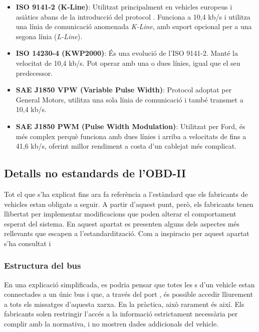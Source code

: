 \documentclass{tfgitic}[2024/07/01]
\begin{document}
\begin{itemize}
  \item \textbf{ISO 9141-2 (K-Line)}: Utilitzat principalment en vehicles europeus i asiàtics abans de la introducció del protocol . Funciona a 10,4 kb/s i utilitza 
  una línia de comunicació anomenada \textit{K-Line}, amb suport opcional per a una segona línia (\textit{L-Line}).
  
  \item \textbf{ISO 14230-4 (KWP2000)}: És una evolució de l'ISO 9141-2. Manté la velocitat de 10,4 kb/s. Pot operar amb una o dues línies, igual que el seu predecessor.
  
  \item \textbf{SAE J1850 VPW (Variable Pulse Width)}: Protocol adoptat per General Motors, utilitza una sola línia de comunicació i també transmet a 10,4 kb/s.

  \item \textbf{SAE J1850 PWM (Pulse Width Modulation)}: Utilitzat per Ford, és més complex perquè funciona amb dues línies i arriba a velocitats de fins a 41,6 kb/s, 
  oferint millor rendiment a costa d'un cablejat més complicat.
\end{itemize} 

\subsection{Detalls no estandards de l'OBD-II}

Tot el que s'ha explicat fins ara fa referència a l'estàndard que els fabricants de vehicles estan obligats a seguir. A partir d'aquest punt, però, 
els fabricants tenen llibertat per implementar modificacions que poden alterar el comportament esperat del sistema. En aquest apartat es presenten 
alguns dels aspectes més rellevants que escapen a l'estandardització. Com a inspiracio per aquest apartat s'ha consultat \cite{youtube_canreality} i \cite{can_vehicle_systems}

\subsubsection{Estructura del bus}

En una explicació simplificada, es podria pensar que totes les s d'un vehicle estan connectades a un únic bus 
 i que, a través del port , és possible accedir lliurement a tots els missatges d'aquesta xarxa. En la pràctica, això rarament és així. 
Els fabricants solen restringir l'accés a la informació estrictament necessària per complir amb la normativa, i no mostren dades addicionals del vehicle.
\end{document}
